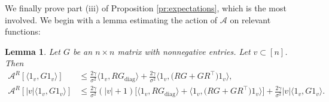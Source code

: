 \documentclass[11pt,reqno]{amsart}
\numberwithin{equation}{section}
\newtheorem{lemma}[theorem]{Lemma}
\theoremstyle{definition}
\def\A{{\mathcal A}}
\begin{document}
We finally prove part (iii) of Proposition \ref{pr:expectations}, which is the most involved. We begin with a lemma estimating the action of $\A$ on relevant functions:


\begin{lemma} \label{le:AF-quadratic}
	Let $ G $ be  an $n \times n$ matrix with nonnegative entries. Let $v \subset [n]$. Then
		\begin{align} 
			\A^{R} [\langle 1_v, G1_v\rangle ] &\le \frac{2\gamma}{\sigma^2} \langle 1_v , R G_{\mathrm{diag}}\rangle  + \frac{2\gamma}{\sigma^2}   \langle 1_v, \big( R G +GR^\top \big) 1_v\rangle , \label{eq: AF.bound.0} \\
			\A^{R} [  |v| \langle 1_v, G1_v\rangle ]  &\le \frac{2\gamma}{\sigma^2} (|v|+ 1) \Big[  \langle 1_v , R G_{\mathrm{diag}}\rangle  + \langle 1_v, \big( R G +GR^\top  \big) 1_v\rangle\Big] + \frac{2\gamma}{\sigma^2}  |v|\langle 1_v,G1_v\rangle .  \label{eq: AF.bound.1}
		\end{align} 
\end{lemma}
\end{document}

